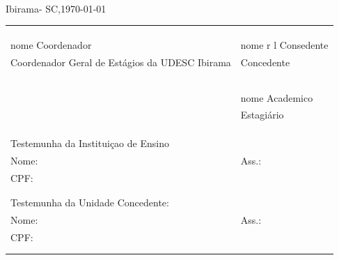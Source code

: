 \documentclass[10pt,a4paper]{article}
\begin{document}
\ \ \ \ \ \ \ \ \ \ \ \ \ \ \ \ 

\begin{flushright}Ibirama- SC,\today\end{flushright}

\begin{table}[h]

\begin{tabular*}{1\textwidth}{p{9cm}p{6cm}}
&	\\
&	\\
 \hrulefill  & \hrulefill \\
nome Coordenador &  nome r l  Consedente \\

Coordenador Geral de Estágios da UDESC Ibirama & Concedente \\
&\\&\\&\\&\\

 & \hrulefill \\
 &nome Academico\\
 &	Estagiário \\
&\\&\\&\\

Testemunha da Instituiçao de Ensino &  \\


Nome:\hrulefill & Ass.:\hrulefill \\

CPF:\hrulefill & \\
& \\
& \\
Testemunha da Unidade Concedente: & \\

Nome:\hrulefill& Ass.:\hrulefill \\

CPF:\hrulefill & \\
& \\
& \\
\hline
\end{tabular*}
\end{table}
\end{document}
